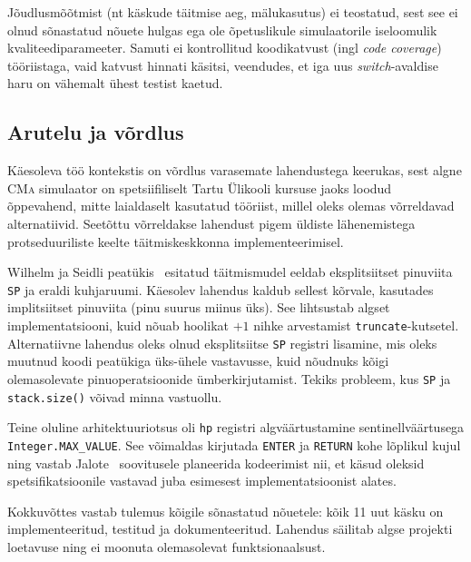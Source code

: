 Jõudlusmõõtmist (nt käskude täitmise aeg, mälukasutus) ei teostatud, sest see ei olnud sõnastatud nõuete hulgas ega ole õpetuslikule simulaatorile iseloomulik kvaliteediparameeter. Samuti ei kontrollitud koodikatvust (ingl \emph{code coverage}) tööriistaga, vaid katvust hinnati käsitsi, veendudes, et iga uus \emph{switch}-avaldise haru on vähemalt ühest testist kaetud.

\subsection{Arutelu ja võrdlus}\label{tulemused:arutelu}

Käesoleva töö kontekstis on võrdlus varasemate lahendustega keerukas, sest algne \textsc{CMa} simulaator on spetsiifiliselt Tartu Ülikooli kursuse jaoks loodud õppevahend, mitte laialdaselt kasutatud tööriist, millel oleks olemas võrreldavad alternatiivid. Seetõttu võrreldakse lahendust pigem üldiste lähenemistega protseduuriliste keelte täitmiskeskkonna implementeerimisel.

Wilhelm ja Seidli peatükis~\cite{wilhelm_imperative_2010} esitatud täitmismudel eeldab eksplitsiitset pinuviita \texttt{SP} ja eraldi kuhjaruumi. Käesolev lahendus kaldub sellest kõrvale, kasutades implitsiitset pinuviita (pinu suurus miinus üks). See lihtsustab algset implementatsiooni, kuid nõuab hoolikat $+1$ nihke arvestamist \texttt{truncate}-kutsetel. Alternatiivne lahendus oleks olnud eksplitsiitse \texttt{SP} registri lisamine, mis oleks muutnud koodi peatükiga üks-ühele vastavusse, kuid nõudnuks kõigi olemasolevate pinuoperatsioonide ümberkirjutamist. Tekiks probleem, kus \texttt{SP} ja \texttt{stack.size()} võivad minna vastuollu.

Teine oluline arhitektuuriotsus oli \texttt{hp} registri algväärtustamine sentinellväärtusega \texttt{Integer.MAX\_VALUE}. See võimaldas kirjutada \texttt{ENTER} ja \texttt{RETURN} kohe lõplikul kujul ning vastab Jalote~\cite{jalote_coding_2025} soovitusele planeerida kodeerimist nii, et käsud oleksid spetsifikatsioonile vastavad juba esimesest implementatsioonist alates.

Kokkuvõttes vastab tulemus kõigile sõnastatud nõuetele: kõik 11 uut käsku on implementeeritud, testitud ja dokumenteeritud. Lahendus säilitab algse projekti loetavuse ning ei moonuta olemasolevat funktsionaalsust.